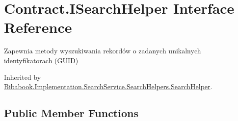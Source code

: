 \hypertarget{interface_contract_1_1_i_search_helper}{}\section{Contract.\+I\+Search\+Helper Interface Reference}
\label{interface_contract_1_1_i_search_helper}


Zapewnia metody wyszukiwania rekordów o zadanych unikalnych identyfikatorach (G\+U\+I\+D)  




Inherited by \hyperlink{class_bibabook_1_1_implementation_1_1_search_service_1_1_search_helpers_1_1_search_helper}{Bibabook.\+Implementation.\+Search\+Service.\+Search\+Helpers.\+Search\+Helper}.

\subsection*{Public Member Functions}
